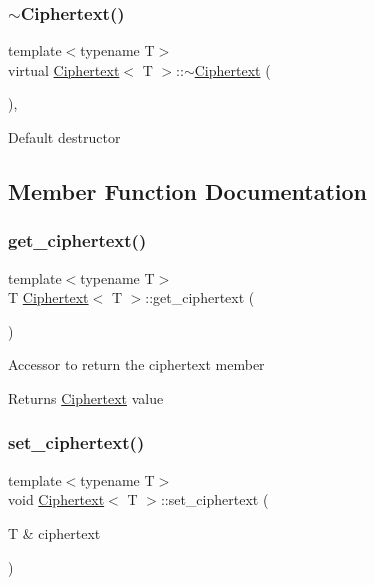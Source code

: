 \subsubsection{\texorpdfstring{$\sim$\+Ciphertext()}{~Ciphertext()}}
{\footnotesize\ttfamily template$<$typename T$>$ \\
virtual \hyperlink{classCiphertext}{Ciphertext}$<$ T $>$\+::$\sim$\hyperlink{classCiphertext}{Ciphertext} (\begin{DoxyParamCaption}{ }\end{DoxyParamCaption})\hspace{0.3cm}{\ttfamily [inline]}, {\ttfamily [virtual]}}

Default destructor 

\subsection{Member Function Documentation}
\mbox{\label{classCiphertext_a42d2210e9b019ce36a401ad9a97d03ac}} 
\subsubsection{\texorpdfstring{get\+\_\+ciphertext()}{get\_ciphertext()}}
{\footnotesize\ttfamily template$<$typename T$>$ \\
T \hyperlink{classCiphertext}{Ciphertext}$<$ T $>$\+::get\+\_\+ciphertext (\begin{DoxyParamCaption}{ }\end{DoxyParamCaption})\hspace{0.3cm}{\ttfamily [inline]}}

Accessor to return the ciphertext member \begin{DoxyReturn}{Returns}
\hyperlink{classCiphertext}{Ciphertext} value 
\end{DoxyReturn}
\mbox{\label{classCiphertext_a8ea04527ee2a98ef214edfd8bd0156f8}} 
\subsubsection{\texorpdfstring{set\+\_\+ciphertext()}{set\_ciphertext()}}
{\footnotesize\ttfamily template$<$typename T$>$ \\
void \hyperlink{classCiphertext}{Ciphertext}$<$ T $>$\+::set\+\_\+ciphertext (\begin{DoxyParamCaption}\item[{T \&}]{ciphertext }\end{DoxyParamCaption})\hspace{0.3cm}{\ttfamily [inline]}}

